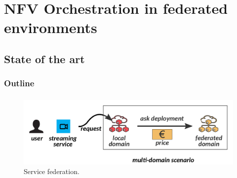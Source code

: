 \documentclass[aspectratio=169]{beamer}
\begin{document}
\section{NFV Orchestration in federated environments}
\subsection{State of the art}
\begin{frame}
    \frametitle{Outline}
    \tableofcontents[subsectionstyle=show/shaded/hide,sectionstyle=show/shaded]
\end{frame}





\begin{frame}
    \frametitle{\secname}
    \framesubtitle{\subsecname}

    \begin{figure}
        \centering
        \includegraphics[width=\textwidth]{img/federation.pdf}
        \caption{Service federation.}
        \label{fig:federation}
    \end{figure}

\end{frame}
\end{document}
